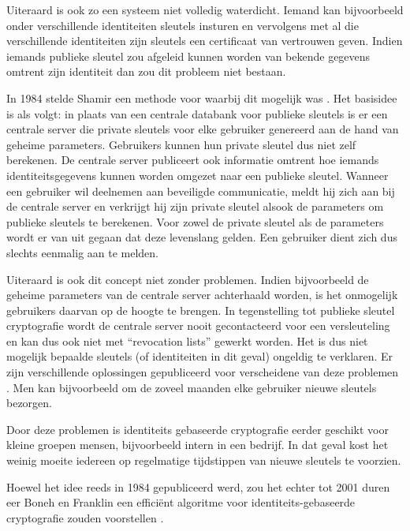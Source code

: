Uiteraard is ook zo een systeem niet volledig waterdicht. Iemand kan bijvoorbeeld onder verschillende identiteiten sleutels insturen en vervolgens met al die verschillende identiteiten zijn sleutels een certificaat van vertrouwen geven. Indien iemands publieke sleutel zou afgeleid kunnen worden van bekende gegevens omtrent zijn identiteit dan zou dit probleem niet bestaan.

In 1984 stelde Shamir een methode voor waarbij dit mogelijk was \cite{shamir}. Het basisidee is als volgt: in plaats van een centrale databank voor publieke sleutels is er een centrale server die private sleutels voor elke gebruiker genereerd aan de hand van geheime parameters. Gebruikers kunnen hun private sleutel dus niet zelf berekenen. De centrale server publiceert ook informatie omtrent hoe iemands identiteitsgegevens kunnen worden omgezet naar een publieke sleutel. Wanneer een gebruiker wil deelnemen aan beveiligde communicatie, meldt hij zich aan bij de centrale server en verkrijgt hij zijn private sleutel alsook de parameters om publieke sleutels te berekenen. Voor zowel de private sleutel als de parameters wordt er van uit gegaan dat deze levenslang gelden. Een gebruiker dient zich dus slechts eenmalig aan te melden.

Uiteraard is ook dit concept niet zonder problemen. Indien bijvoorbeeld de geheime parameters van de centrale server achterhaald worden, is het onmogelijk gebruikers daarvan op de hoogte te brengen. In tegenstelling tot publieke sleutel cryptografie wordt de centrale server nooit gecontacteerd voor een versleuteling en kan dus ook niet met ``revocation lists'' gewerkt worden. Het is dus niet mogelijk bepaalde sleutels (of identiteiten in dit geval) ongeldig te verklaren. Er zijn verschillende oplossingen gepubliceerd voor verscheidene van deze problemen \cite{maas, bla, blie, bloe}. Men kan bijvoorbeeld om de zoveel maanden elke gebruiker nieuwe sleutels bezorgen.

Door deze problemen is identiteits gebaseerde cryptografie eerder geschikt voor kleine groepen mensen, bijvoorbeeld intern in een bedrijf. In dat geval kost het weinig moeite iedereen op regelmatige tijdstippen van nieuwe sleutels te voorzien. 

Hoewel het idee reeds in 1984 gepubliceerd werd, zou het echter tot 2001 duren eer Boneh en Franklin een effici\"ent algoritme voor identiteits-gebaseerde cryptografie zouden voorstellen \cite{boneh}.
